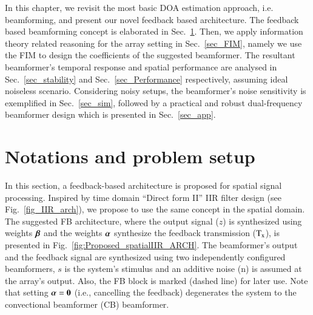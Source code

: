 In this chapter, we revisit the most basic DOA estimation approach, i.e. beamforming, and present our novel feedback based architecture.
The feedback based beamforming concept is elaborated in Sec.~\ref{sec_introduceFeedback}.
Then, we apply information theory related reasoning for the array setting in Sec.~\ref{sec_FIM}, namely we use the FIM to design the coefficients of the suggested beamformer.
The resultant beamformer's temporal response and spatial performance are analysed in Sec.~\ref{sec_stability} and Sec.~\ref{sec_Performance} respectively, assuming ideal noiseless scenario.
Considering noisy setups, the beamformer's noise sensitivity is exemplified in Sec.~\ref{sec_sim}, followed by a practical and robust dual-frequency beamformer design which is presented in Sec.~\ref{sec_app}.

\section{Notations and problem setup}
\label{sec_introduceFeedback}
In this section, a feedback-based architecture is proposed for spatial signal processing.
Inspired by time domain ``Direct form II'' IIR filter design (see Fig.~\ref{fig_IIR_arch}), 
we propose to use the same concept in the spatial domain.
The suggested FB architecture, where the output signal ($z$) is synthesized using weights $\boldsymbol{\beta}$ and the weights $\boldsymbol{\alpha}$ synthesize the feedback transmission ($\text{T}_{\text{x}}$), is presented in Fig.~\ref{fig:Proposed_spatialIIR_ARCH}. The beamformer's output and the feedback signal are synthesized using two independently configured beamformers, $s$ is the system's stimulus and an additive noise (n) is assumed at the array's output.
Also, the FB block is marked (dashed line) for later use.
Note that setting $\boldsymbol{\alpha}=\boldsymbol{0}$ (i.e., cancelling the feedback) degenerates the system to the convectional beamformer (CB) beamformer.
